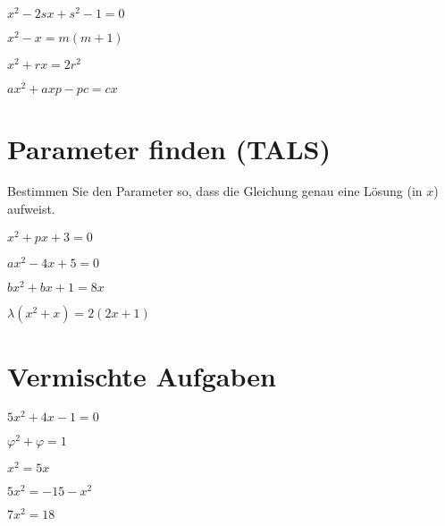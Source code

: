 \begin{bbwAufgabenBlock}
\item $ x^2 - 2sx + s^2 -1 = 0$

\item $ x^2 - x= m(m+1)$

\item $ x^2 + rx = 2r^2 $

\item $ ax^2 + axp - pc = cx$


\end{bbwAufgabenBlock}
\newpage
\section{Parameter finden (TALS)}
Bestimmen Sie den Parameter so, dass die Gleichung genau eine Lösung
(in $x$) aufweist.

\begin{bbwAufgabenBlock}
\item $ x^2 + px + 3= 0$

\item $ ax^2 - 4x + 5= 0$

\item $bx^2 + bx + 1 =8x $

\item $ \lambda (x^2+x)=2(2x+1) $


\end{bbwAufgabenBlock}
\newpage
\section{Vermischte Aufgaben}

\begin{bbwAufgabenBlock}
\item $ 5x^2 + 4x - 1 = 0$

\item $ \varphi^2 + \varphi = 1$

\item $ x^2= 5x$

\item $ 5x^2 = -15 - x^2 $
\LoesungsBlock{$\lx= \left\{   \right\}$}

\item $ 7x^2 = 18$


\end{bbwAufgabenBlock}
\newpage

